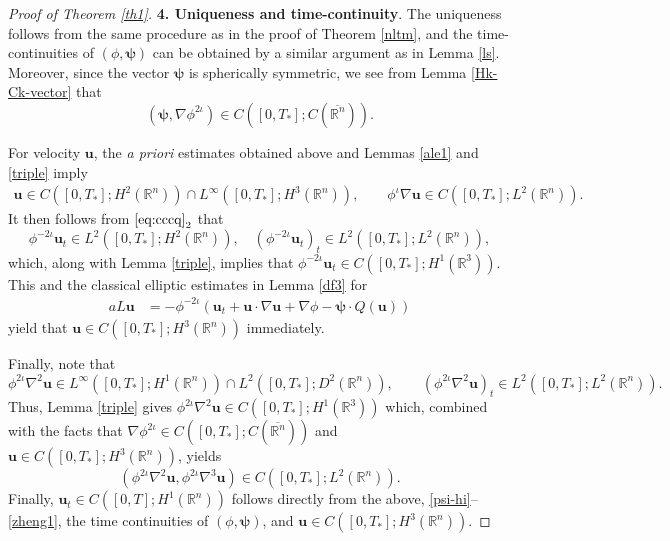 \documentclass[11pt,reqno]{amsart}
\numberwithin{rk}{section}
\numberwithin{prop}{section}
\numberwithin{mydef}{section}
\numberwithin{lem}{section}
\numberwithin{equation}{section}
\numberwithin{thm}{section}
\begin{document}
\begin{proof}[Proof of {\rm Theorem \ref{th1}}]
\smallskip
\textbf{4. Uniqueness and time-continuity}. The uniqueness follows from the same procedure as in the proof of Theorem \ref{nltm}, and the time-continuities of $(\phi,\boldsymbol{\psi})$ can be obtained by a similar argument as in Lemma \ref{ls}. Moreover, since the vector $\boldsymbol{\psi}$ is spherically symmetric, we see from  Lemma \ref{Hk-Ck-vector} that
\begin{equation}\label{psi-hi}
(\boldsymbol{\psi},\nabla \phi^{2\iota}) \in C([0,T_*];C(\overline{\mathbb{R}^n})).
\end{equation}


For velocity $\boldsymbol{u}$,  the \textit{a priori} estimates obtained above and Lemmas \ref{ale1} and \ref{triple} imply 
\begin{equation}\label{zheng1}
\begin{aligned}
\boldsymbol{u}\in C([0,T_*]; H^2(\mathbb{R}^n))\cap  L^\infty([0,T_*]; H^3(\mathbb{R}^n)), \qquad \phi^{\iota}\nabla \boldsymbol{u}\in  C([0,T_*]; L^2(\mathbb{R}^n)).
 \end{aligned}
\end{equation}
It then follows from $\eqref{eq:cccq}_2$ that
\begin{equation*}
\phi^{-2\iota} \boldsymbol{u}_t \in L^2([0,T_*];H^2(\mathbb{R}^n)),\quad (\phi^{-2\iota} \boldsymbol{u}_t)_t \in L^2([0,T_*];L^2(\mathbb{R}^n)),
\end{equation*}
which, along with Lemma \ref{triple}, implies that $\phi^{-2\iota} \boldsymbol{u}_t \in C([0,T_*];H^1(\mathbb{R}^3))$. This and the classical elliptic estimates in Lemma \ref{df3} for
\begin{equation*}
\begin{aligned}
aL\boldsymbol{u}&=-\phi^{-2\iota}(\boldsymbol{u}_t+\boldsymbol{u}\cdot\nabla \boldsymbol{u} +\nabla\phi- \boldsymbol{\psi}  \cdot Q(\boldsymbol{u}))
\end{aligned}
\end{equation*}
yield that $\boldsymbol{u}\in C([0,T_*]; H^{3}(\mathbb{R}^n))$ immediately.

Finally, note that 
\begin{equation*}
\phi^{2\iota}\nabla^2 \boldsymbol{u} \in L^\infty([0,T_*]; H^1(\mathbb{R}^n))\cap L^2([0,T_*] ; D^2(\mathbb{R}^n)),\qquad (\phi^{2\iota}\nabla^2 \boldsymbol{u})_t \in  L^2([0,T_*] ; L^2(\mathbb{R}^n)).
\end{equation*}
Thus, Lemma \ref{triple} gives $\phi^{2\iota}\nabla^2 \boldsymbol{u}\in C([0,T_*]; H^1(\mathbb{R}^3))$ which, combined with the facts that $\nabla \phi^{2\iota} \in C([0,T_*];C(\overline{\mathbb{R}^n}))$ and $\boldsymbol{u}\in C([0,T_*]; H^{3}(\mathbb{R}^n))$, yields 
\begin{equation*}
(\phi^{2\iota}\nabla^2 \boldsymbol{u},\phi^{2\iota}\nabla^3 \boldsymbol{u})\in C([0,T_*]; L^2(\mathbb{R}^n)).
\end{equation*}
Finally, $\boldsymbol{u}_t\in C([0,T];H^1(\mathbb{R}^n))$ follows directly from the above, \eqref{psi-hi}--\eqref{zheng1}, the time continuities of $(\phi,\boldsymbol{\psi})$, and $\boldsymbol{u}\in C([0,T_*]; H^{3}(\mathbb{R}^n))$. 
\end{proof}
\end{document}
